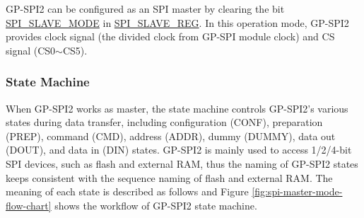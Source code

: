 \documentclass[main\_\_EN.tex]{subfiles}
\begin{document}
GP-SPI2 can be configured as an SPI master by clearing the bit \hyperref[regdesc:SPISLAVEREG]{SPI\_SLAVE\_MODE} in \hyperref[fielddesc:SPISLAVEMODE]{SPI\_SLAVE\_REG}. In this operation mode, GP-SPI2 provides clock signal (the divided clock from GP-SPI module clock) and CS signal (CS0$\sim$CS5).

\subsubsection{State Machine}
\label{sec:gp-spi2-state-machine}

When GP-SPI2 works as master, the state machine controls GP-SPI2's various states during data transfer, including configuration (CONF), preparation (PREP), command (CMD), address (ADDR), dummy (DUMMY), data out (DOUT), and data in (DIN) states. GP-SPI2 is mainly used to access 1/2/4-bit SPI devices, such as flash and external RAM, thus the naming of GP-SPI2 states keeps consistent with the sequence naming of flash and external RAM. The meaning of each state is described as follows and Figure \ref{fig:spi-master-mode-flow-chart} shows the workflow of GP-SPI2 state machine.
\end{document}
